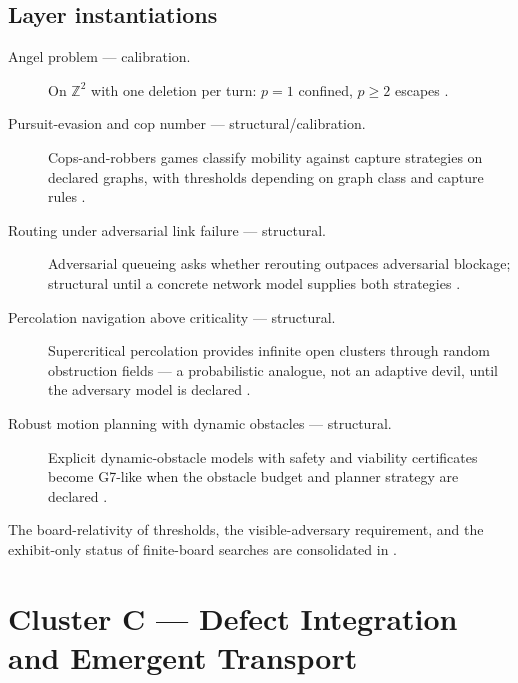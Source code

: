 \documentclass[11pt]{article}
\newcommand{\clusterC}{Defect Integration and Emergent Transport}
\theoremstyle{definition}
\begin{document}
\subsection*{Layer instantiations}\label{layer-inst:G7}
\begin{description}
  \item[Angel problem --- calibration.] On $\mathbb{Z}^2$ with one deletion per turn: $p = 1$
    confined, $p \ge 2$ escapes
    \citep{BerlekampConwayGuy1982,Conway1996,Bowditch2007,Mathe2007,Kloster2007,Gacs2007}.
  \item[Pursuit-evasion and cop number --- structural/calibration.] Cops-and-robbers games classify
    mobility against capture strategies on declared graphs, with thresholds depending on graph class
    and capture rules \citep{NowakowskiWinkler1983,AignerFromme1984}.
  \item[Routing under adversarial link failure --- structural.] Adversarial queueing asks whether
    rerouting outpaces adversarial blockage; structural until a concrete network model supplies both
    strategies \citep{BorodinEtAl2001}.
  \item[Percolation navigation above criticality --- structural.] Supercritical percolation provides
    infinite open clusters through random obstruction fields --- a probabilistic analogue, not an
    adaptive devil, until the adversary model is declared \citep{Grimmett1999,Kesten1982}.
  \item[Robust motion planning with dynamic obstacles --- structural.] Explicit dynamic-obstacle
    models with safety and viability certificates become G7-like when the obstacle budget and planner
    strategy are declared \citep{LaValle2006,FraichardAsama2004}.
\end{description}

The board-relativity of thresholds, the visible-adversary requirement, and the exhibit-only status of
finite-board searches are consolidated in .
\section{Cluster C --- \clusterC}\label{sec:clusterC}
\end{document}
